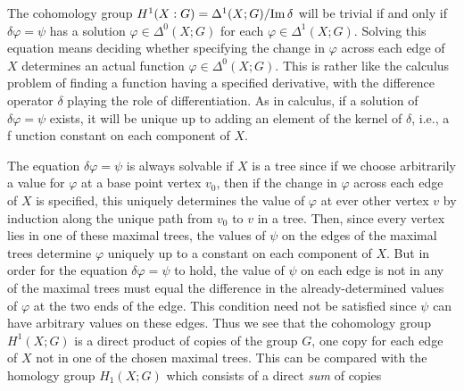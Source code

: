 The cohomology group \(H^1(X:G)=\Delta^1(X;G)/{\operatorname{Im}\delta}\) will be
trivial if and only if \(\delta\varphi=\psi\) has a solution
\(\varphi\in\Delta^0(X;G)\) for each \(\varphi\in\Delta^1(X;G)\). Solving
this equation means deciding whether specifying the change in \(\varphi\)
across each edge of \(X\) determines an actual function
\(\varphi\in\Delta^0(X;G)\). This is rather like the calculus problem of
finding a function having a specified derivative, with the difference
operator \(\delta\) playing the role of differentiation. As in calculus, if
a solution of \(\delta\varphi=\psi\) exists, it will be unique up to adding
an element of the kernel of \(\delta\), i.e., a f unction constant on each
component of \(X\).

The equation \(\delta\varphi=\psi\) is always solvable if \(X\) is a tree
since if we choose arbitrarily a value for \(\varphi\) at a base point
vertex \(v_0\), then if the change in \(\varphi\) across each edge of \(X\)
is specified, this uniquely determines the value of \(\varphi\) at ever
other vertex \(v\) by induction along the unique path from \(v_0\) to \(v\)
in a tree. Then, since every vertex lies in one of these maximal trees, the
values of \(\psi\) on the edges of the maximal trees determine \(\varphi\)
uniquely up to a constant on each component of \(X\). But in order for the
equation \(\delta\varphi=\psi\) to hold, the value of \(\psi\) on each edge
is not in any of the maximal trees must equal the difference in the
already-determined values of \(\varphi\) at the two ends of the edge. This
condition need not be satisfied since \(\psi\) can have arbitrary values on
these edges. Thus we see that the cohomology group \(H^1(X;G)\) is a direct
product of copies of the group \(G\), one copy for each edge of \(X\) not
in one of the chosen maximal trees. This can be compared with the homology
group \(H_1(X;G)\) which consists of a direct \emph{sum} of copies

